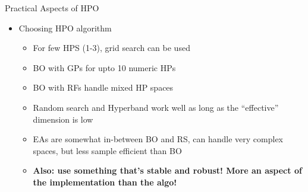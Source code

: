 \documentclass[11pt,compress,t,notes=noshow, xcolor=table]{beamer}
\begin{document}
\begin{vbframe}{Practical Aspects of HPO}
\begin{itemize}
    \item Choosing HPO algorithm
    \begin{itemize}
        \item For few HPS (1-3), grid search can be used
        \item BO with GPs for upto 10 numeric HPs 
        \item BO with RFs handle mixed HP spaces
        \item Random search and Hyperband work well as long as the ``effective'' dimension is low
        \item EAs are somewhat in-between BO and RS, can handle very complex spaces, but less sample efficient than BO
        \item \textbf{Also: use something that's stable and robust! 
          More an aspect of the implementation than the algo!}
    \end{itemize}
\end{itemize}

\end{vbframe}

\end{document}

